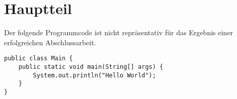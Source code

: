 \section{Hauptteil}

Der folgende Programmcode ist nicht repräsentativ für das Ergebnis einer
erfolgreichen Abschlussarbeit.

\begin{lstlisting}
public class Main {
    public static void main(String[] args) {
        System.out.println("Hello World");
    }
}
\end{lstlisting}
